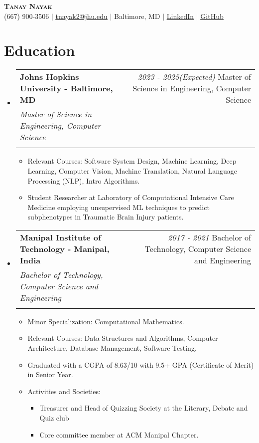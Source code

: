\documentclass[letterpaper,10pt]{article} %
\makeatletter
\newcommand{\resumeItem}[1]{
  \item\small{
    {#1 \vspace{-2pt}}
  }
}
\newcommand{\resumeSubheading}[4]{
  \vspace{-2pt}\item
    \begin{tabular*}{0.97\textwidth}[t]{l@{\extracolsep{\fill}}r}
      \textbf{#1 - #2} & \textit{\small #4}
      \def\temp{#3}%
      \ifx\temp\empty %
      \else
        \\
        \textit{\small#3}\\
      \fi
    \end{tabular*}\vspace{-7pt}
}
\newcommand{\resumeSubHeadingListStart}{\begin{itemize}[leftmargin=0.15in, label={}]}
\newcommand{\resumeSubHeadingListEnd}{\end{itemize}}
\newcommand{\resumeItemListStart}{\begin{itemize}}
\newcommand{\resumeItemListEnd}{\end{itemize}\vspace{-5pt}}
\makeatother
\begin{document}
\begin{center}
    \textbf{\Huge \scshape Tanay Nayak} \\ \vspace{1pt}
    \small (667) 900-3506 $|$ \href{mailto:tnayak2@jhu.edu}{\underline{tnayak2@jhu.edu}} $|$ 
    Baltimore, MD $|$
    \href{https://www.linkedin.com/in/tanay-nayak/}{\underline{LinkedIn}} $|$
    \href{https://github.com/tanaynayak}{\underline{GitHub}}
\end{center}

\section{Education}
  \resumeSubHeadingListStart
    \resumeSubheading
      {Johns Hopkins University}{Baltimore, MD}
      {Master of Science in Engineering, Computer Science}{2023 - 2025(Expected)}
    \begin{itemize}
        \resumeItem{Relevant Courses: Software System Design, Machine Learning, Deep Learning, Computer Vision, Machine Translation, Natural Language Processing (NLP), Intro Algorithms.}
        \item Student Researcher at Laboratory of Computational Intensive Care Medicine employing unsupervised ML techniques to predict subphenotypes in Traumatic Brain Injury patients.
    \end{itemize}
    
    \resumeSubheading
      {Manipal Institute of Technology}{Manipal, India}
      {Bachelor of Technology, Computer Science and Engineering}{2017 - 2021}
    \resumeItemListStart
        \resumeItem{Minor Specialization: Computational Mathematics.}
        \resumeItem{ Relevant Courses: Data Structures and Algorithms, Computer Architecture, Database Management, Software Testing.}
        \resumeItem{ Graduated with a CGPA of 8.63/10 with 9.5+ GPA (Certificate of Merit) in Senior Year.}
        \resumeItem{ Activities and Societies:}
        \begin{itemize}[label=\textopenbullet]
            \item {\small Treasurer and Head of Quizzing Society at the Literary, Debate and Quiz club}
            \item {\small Core committee member at ACM Manipal Chapter.}
        \end{itemize}
    \resumeItemListEnd
  \resumeSubHeadingListEnd
\end{document}
